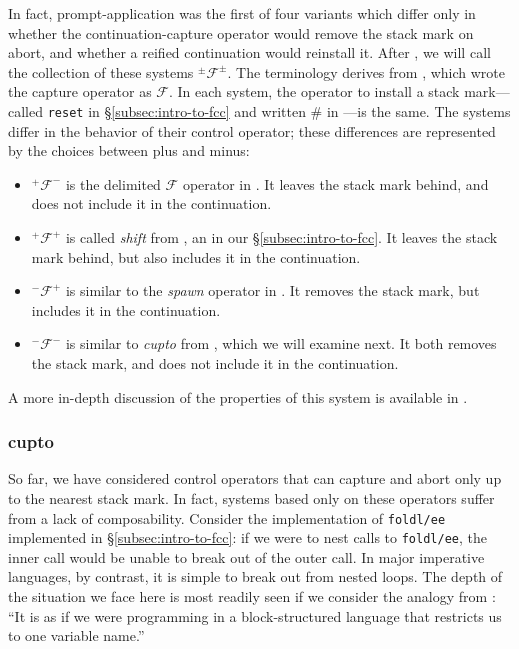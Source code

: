 \documentclass[11pt]{article}
\newcommand{\maybePage}{\null}
\newcommand\F{\mathcal{F}}
\newcommand\pmFpm{^\pm\F^\pm}
\begin{document}
In fact, prompt-application was the first of four variants which differ only in whether the continuation-capture operator would remove the stack mark on abort, and whether a reified continuation would reinstall it.
After \cite{MFDC}, we will call the collection of these systems $\pmFpm$.
The terminology derives from \cite{PromptApplication}, which wrote the capture operator as $\mathcal{F}$.
In each system, the operator to install a stack mark---called \texttt{reset} in \S\ref{subsec:intro-to-fcc} and written $\#$ in \cite{PromptApplication}---is the same.
The systems differ in the behavior of their control operator; these differences are represented by the choices between plus and minus:
\begin{itemize}
\item $^+\mathcal{F}^-$ is the delimited $\mathcal{F}$ operator in \cite{PromptApplication}. It leaves the stack mark behind, and does not include it in the continuation.
\item $^+\mathcal{F}^+$ is called \emph{shift} from \cite{AbstractingControl}, an in our \S\ref{subsec:intro-to-fcc}. It leaves the stack mark behind, but also includes it in the continuation.
\item $^-\mathcal{F}^+$ is similar to the \emph{spawn} operator in \cite{ContinuationsAndConcurrency}. It removes the stack mark, but includes it in the continuation.
\item $^-\mathcal{F}^-$ is similar to \emph{cupto} from \cite{Gunter:1995}, which we will examine next. It both removes the stack mark, and does not include it in the continuation.
\end{itemize}
A more in-depth discussion of the properties of this system is available in \cite{MFDC}.

\maybePage
\subsubsection{cupto}
\label{subsec:cupto}

So far, we have considered control operators that can capture and abort only up to the nearest stack mark.
In fact, systems based only on these operators suffer from a lack of composability.
Consider the implementation of \texttt{foldl/ee} implemented in \S\ref{subsec:intro-to-fcc}: if we were to nest calls to \texttt{foldl/ee}, the inner call would be unable to break out of the outer call.
In major imperative languages, by contrast, it is simple to break out from nested loops.
The depth of the situation we face here is most readily seen if we consider the analogy from \cite{ContinuationsAndConcurrency}: ``It is as if we were programming in a block-structured language that restricts us to one variable name.''
\end{document}
